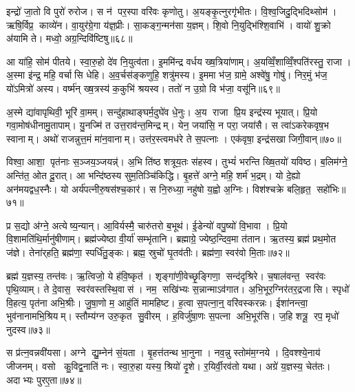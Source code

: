इन्द्रो॑ जा॒तो वि पुरो॑ रुरोज। स न॑ पर॒स्पा वरि॑वः कृणोतु। अ॒यङ्कृ॒त्नुरगृ॑भीतः। वि॒श्व॒जिदु॒द्भिदिथ्सोम॑। ऋषि॒र्विप्र॒ काव्ये॑न। वा॒युर॑ग्रे॒गा य॑ज्ञ॒प्रीः। सा॒कङ्ग॒न्मन॑सा य॒ज्ञम्। शि॒वो नि॒युद्भि॑श्शि॒वाभि॑। वायो॑ शु॒क्रो अ॑यामि ते। मध्वो॒ अग्र॒न्दिवि॑ष्टिषु॥६८॥

आ या॑हि॒ सोम॑ पीतये। स्वा॒रु॒हो दे॑व नि॒युत्व॑ता। इ॒ममि॑न्द्र वर्धय ख्ष॒त्रिया॑णाम्। अ॒यव्विँ॒शाव्विँ॒श्पति॑रस्तु॒ राजा। अ॒स्मा इ॑न्द्र॒ महि॒ वर्चासि धेहि। अ॒व॒र्चस॑ङ्कणुहि॒ शत्रु॑मस्य। इ॒ममा भ॑ज॒ ग्रामे॒ अश्वे॑षु॒ गोषु॑। निर॒मुं भ॑ज॒ यो॑ऽमित्रो॑ अस्य। वर्ष्म॑न् ख्ष॒त्रस्य॑ क॒कुभि॑ श्रयस्व। ततो॑ न उ॒ग्रो वि भ॑जा॒ वसू॑नि॥६९॥

अ॒स्मे द्या॑वापृथिवी॒ भूरि॑ वा॒मम्। सन्दु॑हाथाङ्घर्म॒दुघे॑व धे॒नुः। अ॒य राजा प्रि॒य इन्द्र॑स्य भूयात्। प्रि॒यो गवा॒मोष॑धीनामु॒तापाम्। यु॒नज्मि॑ त उत्त॒राव॑न्त॒मिन्द्रम्। येन॒ जया॑सि॒ न परा॒ जया॑सै। स त्वा॑ऽकरेकवृष॒भ स्वानाम्। अथो॑ राजन्नुत्त॒मं मा॑न॒वानाम्। उत्त॑र॒स्त्वमध॑रे ते स॒पत्नाः। एक॑वृषा॒ इन्द्र॑सखा जिगी॒वान्॥७०॥

विश्वा॒ आशा॒ पृत॑नाः स॒ञ्जय॒ञ्जयन्न्॑। अ॒भि ति॑ष्ठ शत्रूय॒तः स॑हस्व। तुभ्यं॑ भरन्ति ख्षि॒तयो॑ यविष्ठ। ब॒लिम॑ग्ने॒ अन्ति॑त॒ ओत दू॒रात्। आ भन्दि॑ष्ठस्य सुम॒तिञ्चि॑किद्धि। बृ॒हत्ते॑ अग्ने॒ महि॒ शर्म॑ भ॒द्रम्। यो दे॒ह्यो अन॑मयद्वध॒स्नैः। यो अर्य॑पत्नीरु॒षस॑श्च॒कार॑। स नि॒रुध्या॒ नहु॑षो य॒ह्वो अ॒ग्निः। विश॑श्चक्रे बलि॒हृत॒ सहो॑भिः॥७१॥

प्र स॒द्यो अ॑ग्ने॒ अत्येष्य॒न्यान्। आ॒विर्यस्मै॒ चारु॑तरो ब॒भूथ॑। ई॒डेन्यो॑ वपु॒ष्यो॑ वि॒भावा। प्रि॒यो वि॒शामति॑थि॒र्मानु॑षीणाम्। ब्रह्म॑ज्येष्ठा वी॒र्या॑ सम्भृ॑तानि। ब्रह्माग्रे॒ ज्येष्ठ॒न्दिव॒मा त॑तान। ऋ॒तस्य॒ ब्रह्म॑ प्रथ॒मोत ज॑ज्ञे। तेना॑र्‌हति॒ ब्रह्म॑णा॒ स्पर्धि॑तु॒ङ्कः। ब्रह्म॒ स्रुचो॑ घृ॒तव॑तीः। ब्रह्म॑णा॒ स्वर॑वो मि॒ताः॥७२॥

ब्रह्म॑ य॒ज्ञस्य॒ तन्त॑वः। ऋ॒त्विजो॒ ये ह॑वि॒ष्कृत॑। शृङ्गा॑णी॒वेच्छृ॒ङ्गिणा॒ सन्द॑दृश्रिरे। च॒षाल॑वन्त॒ स्वर॑वः पृथि॒व्याम्। ते दे॒वास॒ स्वर॑वस्तस्थि॒वास॑। नम॒ सखि॑भ्यः स॒न्नान्माऽव॑गात। अ॒भि॒भूर॒ग्निर॑तर॒द्रजासि। स्पृधो॑ वि॒हत्य॒ पृत॑ना अभि॒श्रीः। जु॒षा॒णो म॒ आहु॑तिं मामहिष्ट। ह॒त्वा स॒पत्ना॒न्॒ वरि॑वस्करन्नः। ईशा॑नन्त्वा॒ भुव॑नानामभि॒श्रियम्। स्तौम्य॑ग्न उरु॒कृत सु॒वीरम्। ह॒विर्जु॑षा॒णः स॒पत्ना अभि॒भूर॑सि। ज॒हि शत्रू॒ रप॒ मृधो॑ नुदस्व॥७३॥\anuvakamend[वि॒शाञ्ज॑यामसि जीरदानो॒ हर्या॒ विश्वा॒ दिवि॑ष्टिषु॒ वसू॑नि जिगी॒वान्थ्सहो॑भिर्मि॒ता न॑श्च॒त्वारि॑ च]

स प्र॑त्न॒वन्नवी॑यसा। अग्ने द्यु॒म्नेन॑ सं॒यता। बृ॒हत्त॑तन्थ भा॒नुना। नव॒न्नु स्तोम॑म॒ग्नये। दि॒वश्श्ये॒नाय॑ जीजनम्। वसो कु॒विद्व॒नाति॑ नः। स्वा॒रु॒हा यस्य॒ श्रियो॑ दृ॒शे। र॒यिर्वी॒रव॑तो यथा। अग्रे॑ य॒ज्ञस्य॒ चेत॑तः। अदाभ्यः पुरए॒ता॥७४॥

